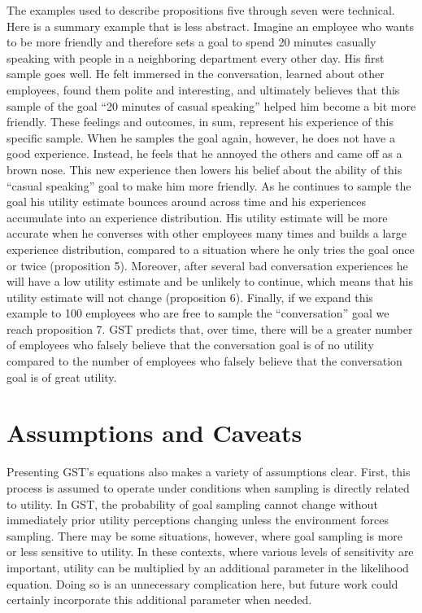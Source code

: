 \documentclass[english,,man]{apa6}
\theoremstyle{definition}
\theoremstyle{definition}
\theoremstyle{definition}
\theoremstyle{remark}
\begin{document}
The examples used to describe propositions five through seven were
technical. Here is a summary example that is less abstract. Imagine an
employee who wants to be more friendly and therefore sets a goal to
spend 20 minutes casually speaking with people in a neighboring
department every other day. His first sample goes well. He felt immersed
in the conversation, learned about other employees, found them polite
and interesting, and ultimately believes that this sample of the goal
\enquote{20 minutes of casual speaking} helped him become a bit more
friendly. These feelings and outcomes, in sum, represent his experience
of this specific sample. When he samples the goal again, however, he
does not have a good experience. Instead, he feels that he annoyed the
others and came off as a brown nose. This new experience then lowers his
belief about the ability of this \enquote{casual speaking} goal to make
him more friendly. As he continues to sample the goal his utility
estimate bounces around across time and his experiences accumulate into
an experience distribution. His utility estimate will be more accurate
when he converses with other employees many times and builds a large
experience distribution, compared to a situation where he only tries the
goal once or twice (proposition 5). Moreover, after several bad
conversation experiences he will have a low utility estimate and be
unlikely to continue, which means that his utility estimate will not
change (proposition 6). Finally, if we expand this example to 100
employees who are free to sample the \enquote{conversation} goal we
reach proposition 7. GST predicts that, over time, there will be a
greater number of employees who falsely believe that the conversation
goal is of no utility compared to the number of employees who falsely
believe that the conversation goal is of great utility.

\hypertarget{assumptions-and-caveats}{%
\section{Assumptions and Caveats}\label{assumptions-and-caveats}}

Presenting GST's equations also makes a variety of assumptions clear.
First, this process is assumed to operate under conditions when sampling
is directly related to utility. In GST, the probability of goal sampling
cannot change without immediately prior utility perceptions changing
unless the environment forces sampling. There may be some situations,
however, where goal sampling is more or less sensitive to utility. In
these contexts, where various levels of sensitivity are important,
utility can be multiplied by an additional parameter in the likelihood
equation. Doing so is an unnecessary complication here, but future work
could certainly incorporate this additional parameter when needed.
\end{document}
